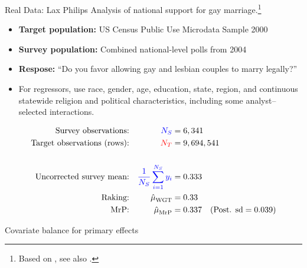






\begin{frame}{Real Data: Lax Philips}
Analysis of national support for gay marriage.\footnote{Based on \textcite{kastellec:2010:laxmrp},
see also \textcite{lax:2009:gay}.}

\begin{itemize}
    \item \textbf{Target population:} US Census Public Use Microdata Sample 2000
    \item \textbf{Survey population:} Combined national-level polls from 2004
    \item \textbf{Respose:}  ``Do you favor allowing gay and lesbian couples to marry legally?''
    \item For regressors, use race, gender, age, education, state, region,
        and continuous statewide religion and political characteristics, including
        some analyst--selected interactions.
\end{itemize}

$$
\begin{aligned}
    \textrm{Survey observations:} &&  \textcolor{blue}{{\textcolor{blue}{N_S}}} ={}& 6,341  \\
    \textrm{Target observations (rows):} &&  \textcolor{red}{{\textcolor{red}{N_T}}} ={}& 9,694,541 \\
    \\
    \textrm{Uncorrected survey mean:} && \textcolor{blue}{\frac{1}{{\textcolor{blue}{N_S}}} \sum_{i=1}^{\textcolor{blue}{N_S}} y_i} ={}& 0.333 \\
    \textrm{Raking:} && \hat{\mu}^{}_{\mathrm{WGT}} ={}& 0.33 \\
    \textrm{MrP:} && \hat{\mu}^{}_{\mathrm{MrP}} ={}& 0.337
        \quad(\textrm{Post. sd} = 0.039)\\
\end{aligned}
$$
%
\end{frame}






\begin{frame}{Covariate balance for primary effects}
\LaxImbalancePrimary{}
\end{frame}


